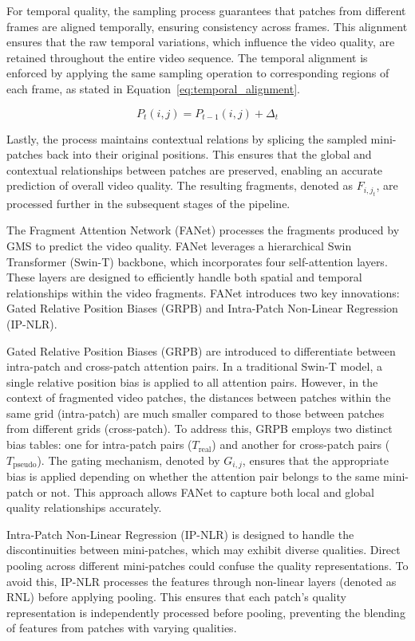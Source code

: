 For temporal quality, the sampling process guarantees that patches from different frames are aligned temporally, ensuring consistency across frames. This alignment ensures that the raw temporal variations, which influence the video quality, are retained throughout the entire video sequence. The temporal alignment is enforced by applying the same sampling operation to corresponding regions of each frame, as stated in Equation~\ref{eq:temporal_alignment}.

\begin{equation}
P_t(i, j) = P_{t-1}(i, j) + \Delta_t
\label{eq:temporal_alignment}
\end{equation}

Lastly, the process maintains contextual relations by splicing the sampled mini-patches back into their original positions. This ensures that the global and contextual relationships between patches are preserved, enabling an accurate prediction of overall video quality. The resulting fragments, denoted as $F_{i,j_t}$, are processed further in the subsequent stages of the pipeline.

The Fragment Attention Network (FANet) processes the fragments produced by GMS to predict the video quality. FANet leverages a hierarchical Swin Transformer (Swin-T) backbone, which incorporates four self-attention layers. These layers are designed to efficiently handle both spatial and temporal relationships within the video fragments. FANet introduces two key innovations: Gated Relative Position Biases (GRPB) and Intra-Patch Non-Linear Regression (IP-NLR).

Gated Relative Position Biases (GRPB) are introduced to differentiate between intra-patch and cross-patch attention pairs. In a traditional Swin-T model, a single relative position bias is applied to all attention pairs. However, in the context of fragmented video patches, the distances between patches within the same grid (intra-patch) are much smaller compared to those between patches from different grids (cross-patch). To address this, GRPB employs two distinct bias tables: one for intra-patch pairs (\(T_{\text{real}}\)) and another for cross-patch pairs (\(T_{\text{pseudo}}\)). The gating mechanism, denoted by \(G_{i,j}\), ensures that the appropriate bias is applied depending on whether the attention pair belongs to the same mini-patch or not. This approach allows FANet to capture both local and global quality relationships accurately.

Intra-Patch Non-Linear Regression (IP-NLR) is designed to handle the discontinuities between mini-patches, which may exhibit diverse qualities. Direct pooling across different mini-patches could confuse the quality representations. To avoid this, IP-NLR processes the features through non-linear layers (denoted as RNL) before applying pooling. This ensures that each patch's quality representation is independently processed before pooling, preventing the blending of features from patches with varying qualities.


